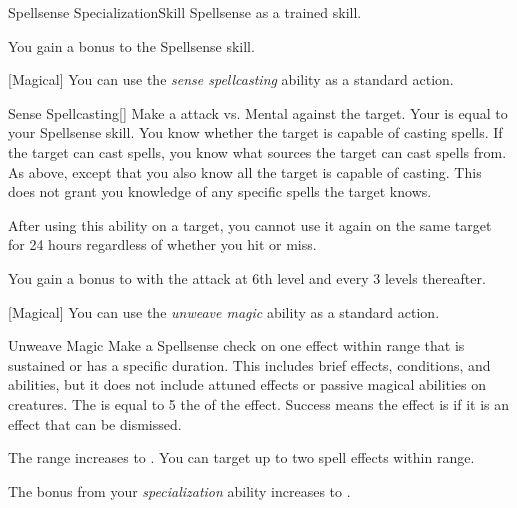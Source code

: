     \begin{feat}{Spellsense Specialization}{Skill}
        \featpre Spellsense as a trained skill.

         You gain a  bonus to the Spellsense skill.

        [Magical] You can use the \textit{sense spellcasting} ability as a standard action.
        \begin{freeability}{Sense Spellcasting}[]
            Make a attack vs. Mental against the target.
            Your  is equal to your Spellsense skill.
            \hit You know whether the target is capable of casting spells.
            If the target can cast spells, you know what sources the target can cast spells from.
            \crit As above, except that you also know all  the target is capable of casting.
            This does not grant you knowledge of any specific spells the target knows.

            After using this ability on a target, you cannot use it again on the same target for 24 hours regardless of whether you hit or miss.

            \rankline
            You gain a  bonus to  with the attack at 6th level and every 3 levels thereafter.
        \end{freeability}

        [Magical] You can use the \textit{unweave magic} ability as a standard action.
        \begin{freeability}{Unweave Magic}
            Make a Spellsense check on one  effect within \rngmed range that is sustained or has a specific duration.
            This includes brief effects, conditions, and  abilities, but it does not include attuned effects or passive magical abilities on creatures.
            The  is equal to 5 \add the  of the effect.
            Success means the effect is  if it is an effect that can be dismissed.

            \rankline
             The range increases to \rnglong.
             You can target up to two spell effects within range.
        \end{freeability}

         The bonus from your \textit{specialization} ability increases to .


\end{feat}
